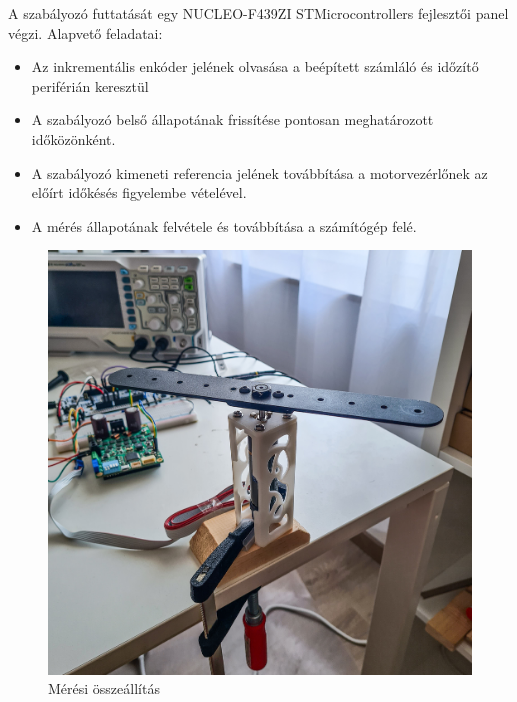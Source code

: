 A szabályozó futtatását egy NUCLEO-F439ZI STMicrocontrollers fejlesztői panel végzi.
Alapvető feladatai:
\begin{itemize}
    \item Az inkrementális enkóder jelének olvasása a beépített számláló és időzítő periférián keresztül
    \item A szabályozó belső állapotának frissítése pontosan meghatározott időközönként.
    \item A szabályozó kimeneti referencia jelének továbbítása a motorvezérlőnek az előírt időkésés figyelembe vételével.
    \item A mérés állapotának felvétele és továbbítása a számítógép felé.
\end{itemize}

\begin{figure}[b!]
	\begin{center}
		\includegraphics[width=14cm]{images/setup_experiment.jpg}
		\caption{Mérési összeállítás}\label{fig:setup_experiment}
	\end{center}
\end{figure}


